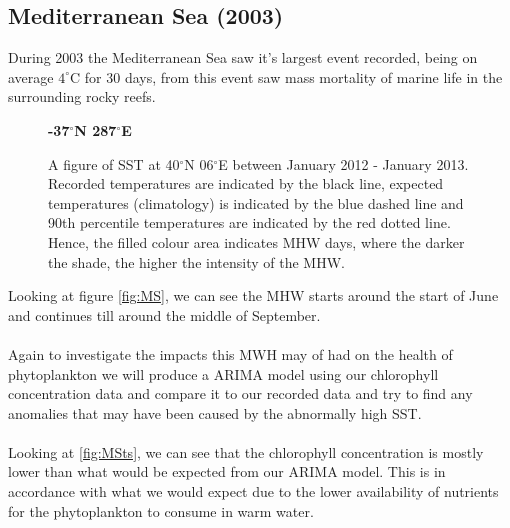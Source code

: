 \subsection{Mediterranean Sea (2003)}

During 2003 the Mediterranean Sea saw it's largest event recorded, being on average $4^{\circ}$C for 30 days, from this event saw mass mortality of marine life in the surrounding rocky reefs.

\begin{figure}[H]
\centering
    \textbf{-37$^{\circ}$N 287$^{\circ}$E}\par
            \caption{A figure of SST at 40$^{\circ}$N 06$^{\circ}$E between January 2012 - January 2013. Recorded temperatures are indicated by the black line, expected temperatures (climatology) is indicated by the blue dashed line and 90th percentile temperatures are indicated by the red dotted line. Hence, the filled colour area indicates MHW days, where the darker the shade, the higher the intensity of the MHW. \cite{MHWtracker}}
            \label{fig:MS}
\end{figure}

Looking at figure \autoref{fig:MS}, we can see the MHW starts around the start of June and continues till around the middle of September.  
\\\\
Again to investigate the impacts this MWH may of had on the health of phytoplankton we will produce a ARIMA model using our chlorophyll concentration data and compare it to our recorded data and try to find any anomalies that may have been caused by the abnormally high SST.
\\\\
Looking at \autoref{fig:MSts}, we can see that the chlorophyll concentration is mostly lower than what would be expected from our ARIMA model. This is in accordance with what we would expect due to the lower availability of nutrients for the phytoplankton to consume in warm water.

